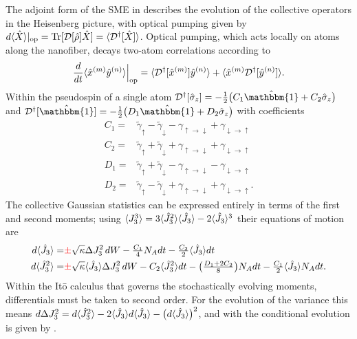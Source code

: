 \documentclass[preprint,aps,pra,onecolumn]{revtex4-1} %
\newcommand{\gammaud}{\gamma_{\uparrow \rightarrow \downarrow}}
\newcommand{\gammadu}{\gamma_{\downarrow \rightarrow \uparrow}}
\newcommand{\gammap}{\tilde{\gamma}_\uparrow + \tilde{\gamma}_\downarrow}
\newcommand{\gammam}{\tilde{\gamma}_\uparrow - \tilde{\gamma}_\downarrow}
\newcommand{\error}[1]{{\color{red} #1}}
\begin{document}
\begin{appendix}
The adjoint form of the SME in  describes the evolution of the collective operators in the Heisenberg picture, with optical pumping given by $d\langle{ \hat{X}}\rangle|_{\rm op} = \mbox{Tr} [\mathcal{D}[\hat{\rho}]\hat{X} ] = \langle{\mathcal{D}^\dagger[\hat{X}]}\rangle$. Optical pumping, which acts locally on atoms along the nanofiber,   decays two-atom correlations according to \cite{baragiola_three-dimensional_2014}
	\begin{align}
		\frac{d}{dt} \langle{ \hat{x}^{(m)} \hat{y}^{(n)} }\rangle \Big|_{\rm op}= \langle{ \mathcal{D}^\dagger[ \hat{x}^{(m)}] \hat{y}^{(n)} }\rangle + \langle{ \hat{x}^{(m)} \mathcal{D}^\dagger[ \hat{y}^{(n)}] }\rangle.
	\end{align}
Within the pseudospin of a single atom $\mathcal{D}\dg[\hat{\sigma}_z] = -\smallfrac{1}{2} \big( C_1 \hat{\mathbbm{1}} + C_2 \hat{\sigma}_z \big)$ and $\mathcal{D}\dg[\hat{\mathbbm{1}}] 	 = -\smallfrac{1}{2} \big( D_1\hat{\mathbbm{1}} + D_2\hat{\sigma}_z \big)$ with coefficients
	\begin{subequations} \label{Eq::DecayCoefficients}
	\begin{align}
		C_1 =& \gammam - \gammaud + \gammadu  \\ 
		C_2 =& \gammap + \gammaud + \gammadu  \\
		D_1 =& \gammap - \gammaud - \gammadu  \\
		D_2 =& \gammam + \gammaud + \gammadu.    
	\end{align}
	\end{subequations}	
The collective Gaussian statistics can be expressed entirely in terms of the first and second moments; using $\langle{J_3^3}\rangle = 3\langle{\hat{J}_3^2}\rangle\langle{\hat{J}_3}\rangle- 2\langle{\hat{J}_3}\rangle^3$ \cite{jacobs_straightforward_2006} their equations of motion are
	\begin{subequations} \label{Eq::J3MomentEquations}
	\begin{align} 
		d \expt{\hat{J}_3} =& \error{\pm} \sqrt{\kappa} \Delta J_3^2 \, dW  - \smallfrac{C_1}{4} N_A dt - \smallfrac{C_2}{2} \expt{\hat{J}_3}dt  \\
		d \expt{\hat{J}_3^2} %
		=& \error{\pm} \sqrt{\kappa} \expt{\hat{J}_3}\Delta J_3^2 \, dW -  C_2 \expt{\hat{J}_3^2}dt -  \big( \smallfrac{D_1 + 2C_2}{8} \big) N_A dt -  \smallfrac{C_1}{2}\expt{\hat{J}_3} N_Adt . 
	\end{align}
	\end{subequations}
Within the It\={o} calculus that governs the stochastically evolving moments, differentials must be taken to second order. For the evolution of the variance this means $d \Delta J_3^2 = d \langle{\hat{J}_3^2}\rangle - 2 \langle{\hat{J}_3}\rangle d \langle{\hat{J}_3}\rangle - \big( d \langle{\hat{J}_3}\rangle \big)^2$, and with  the conditional evolution is given by .


\end{appendix}
\end{document}
